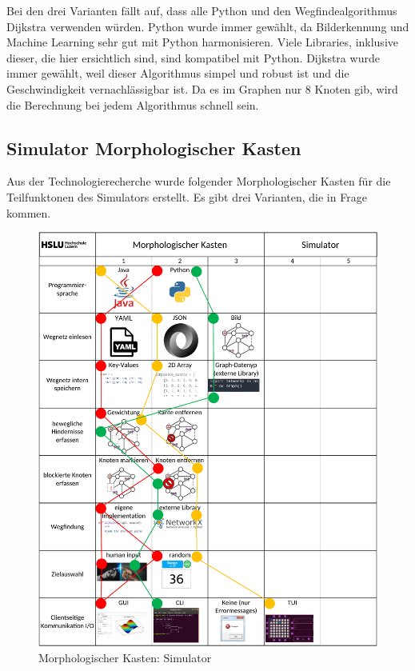 Bei den drei Varianten fällt auf, dass alle Python und den Wegfindealgorithmus Dijkstra verwenden würden. Python wurde immer gewählt, da Bilderkennung und Machine Learning sehr gut mit Python harmonisieren. Viele Libraries, inklusive dieser, die hier ersichtlich sind, sind kompatibel mit Python. Dijkstra wurde immer gewählt, weil dieser Algorithmus simpel und robust ist und die Geschwindigkeit vernachlässigbar ist. Da es im Graphen nur 8 Knoten gib, wird die Berechnung bei jedem Algorithmus schnell sein.

\subsection{Simulator Morphologischer Kasten}


Aus der Technologierecherche wurde folgender Morphologischer Kasten für die Teilfunktonen des Simulators erstellt. Es gibt drei Varianten, die in Frage kommen.

\begin{figure}[H]
\centering
\includegraphics[width=\textwidth]{assets/MK_Simulator.pdf}
\caption{Morphologischer Kasten: Simulator}
\label{fig:mk-simulator}
\end{figure}



